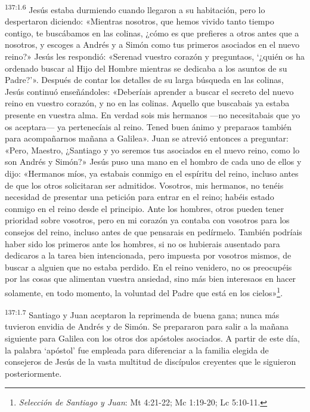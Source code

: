 \par 
\textsuperscript{137:1.6} Jesús estaba durmiendo cuando llegaron a su habitación, pero lo despertaron diciendo: «Mientras nosotros, que hemos vivido tanto tiempo contigo, te buscábamos en las colinas, ¿cómo es que prefieres a otros antes que a nosotros, y escoges a Andrés y a Simón como tus primeros asociados en el nuevo reino?» Jesús les respondió: «Serenad vuestro corazón y preguntaos, `¿quién os ha ordenado buscar al Hijo del Hombre mientras se dedicaba a los asuntos de su Padre?'». Después de contar los detalles de su larga búsqueda en las colinas, Jesús continuó enseñándoles: «Deberíais aprender a buscar el secreto del nuevo reino en vuestro corazón, y no en las colinas. Aquello que buscabais ya estaba presente en vuestra alma. En verdad sois mis hermanos ---no necesitabais que yo os aceptara--- ya pertenecíais al reino. Tened buen ánimo y preparaos también para acompañarnos mañana a Galilea». Juan se atrevió entonces a preguntar: «Pero, Maestro, ¿Santiago y yo seremos tus asociados en el nuevo reino, como lo son Andrés y Simón?» Jesús puso una mano en el hombro de cada uno de ellos y dijo: «Hermanos míos, ya estabais conmigo en el espíritu del reino, incluso antes de que los otros solicitaran ser admitidos. Vosotros, mis hermanos, no tenéis necesidad de presentar una petición para entrar en el reino; habéis estado conmigo en el reino desde el principio. Ante los hombres, otros pueden tener prioridad sobre vosotros, pero en mi corazón ya contaba con vosotros para los consejos del reino, incluso antes de que pensarais en pedírmelo. También podríais haber sido los primeros ante los hombres, si no os hubierais ausentado para dedicaros a la tarea bien intencionada, pero impuesta por vosotros mismos, de buscar a alguien que no estaba perdido. En el reino venidero, no os preocupéis por las cosas que alimentan vuestra ansiedad, sino más bien interesaos en hacer solamente, en todo momento, la voluntad del Padre que está en los cielos»\footnote{\textit{Selección de Santiago y Juan}: Mt 4:21-22; Mc 1:19-20; Lc 5:10-11.}.

\par 
\textsuperscript{137:1.7} Santiago y Juan aceptaron la reprimenda de buena gana; nunca más tuvieron envidia de Andrés y de Simón. Se prepararon para salir a la mañana siguiente para Galilea con los otros dos apóstoles asociados. A partir de este día, la palabra `apóstol' fue empleada para diferenciar a la familia elegida de consejeros de Jesús de la vasta multitud de discípulos creyentes que le siguieron posteriormente.


